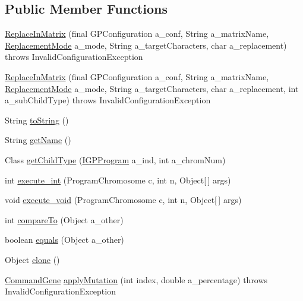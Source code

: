 \subsection*{Public Member Functions}
\begin{DoxyCompactItemize}
\item 
\hyperlink{classorg_1_1jgap_1_1gp_1_1function_1_1_replace_in_matrix_ae6f8fe40b80beb199a05b281ca554c11}{Replace\-In\-Matrix} (final G\-P\-Configuration a\-\_\-conf, String a\-\_\-matrix\-Name, \hyperlink{enumorg_1_1jgap_1_1gp_1_1function_1_1_replace_in_matrix_1_1_replacement_mode}{Replacement\-Mode} a\-\_\-mode, String a\-\_\-target\-Characters, char a\-\_\-replacement)  throws Invalid\-Configuration\-Exception 
\item 
\hyperlink{classorg_1_1jgap_1_1gp_1_1function_1_1_replace_in_matrix_a35cbed13007c21442ce503dc8bb9cfef}{Replace\-In\-Matrix} (final G\-P\-Configuration a\-\_\-conf, String a\-\_\-matrix\-Name, \hyperlink{enumorg_1_1jgap_1_1gp_1_1function_1_1_replace_in_matrix_1_1_replacement_mode}{Replacement\-Mode} a\-\_\-mode, String a\-\_\-target\-Characters, char a\-\_\-replacement, int a\-\_\-sub\-Child\-Type)  throws Invalid\-Configuration\-Exception 
\item 
String \hyperlink{classorg_1_1jgap_1_1gp_1_1function_1_1_replace_in_matrix_a9d9ac5ee1c8a6814f7cb063e15868216}{to\-String} ()
\item 
String \hyperlink{classorg_1_1jgap_1_1gp_1_1function_1_1_replace_in_matrix_a75502ffde9d73ed1eb1b5ac0bf783b69}{get\-Name} ()
\item 
Class \hyperlink{classorg_1_1jgap_1_1gp_1_1function_1_1_replace_in_matrix_aefd10165e5155d78a86a194c85322aef}{get\-Child\-Type} (\hyperlink{interfaceorg_1_1jgap_1_1gp_1_1_i_g_p_program}{I\-G\-P\-Program} a\-\_\-ind, int a\-\_\-chrom\-Num)
\item 
int \hyperlink{classorg_1_1jgap_1_1gp_1_1function_1_1_replace_in_matrix_a84dbd5daa8e2c738d837a943ee6ba38a}{execute\-\_\-int} (Program\-Chromosome c, int n, Object\mbox{[}$\,$\mbox{]} args)
\item 
void \hyperlink{classorg_1_1jgap_1_1gp_1_1function_1_1_replace_in_matrix_a099cd97deb3a46b5b69e17fb8ba48aef}{execute\-\_\-void} (Program\-Chromosome c, int n, Object\mbox{[}$\,$\mbox{]} args)
\item 
int \hyperlink{classorg_1_1jgap_1_1gp_1_1function_1_1_replace_in_matrix_a7deb312915219433abef58f3c38adea1}{compare\-To} (Object a\-\_\-other)
\item 
boolean \hyperlink{classorg_1_1jgap_1_1gp_1_1function_1_1_replace_in_matrix_a1323812a3f0abf036702c8884b59755a}{equals} (Object a\-\_\-other)
\item 
Object \hyperlink{classorg_1_1jgap_1_1gp_1_1function_1_1_replace_in_matrix_a4c7bdfab72376e5442019ac6714c8e79}{clone} ()
\item 
\hyperlink{classorg_1_1jgap_1_1gp_1_1_command_gene}{Command\-Gene} \hyperlink{classorg_1_1jgap_1_1gp_1_1function_1_1_replace_in_matrix_afd62d5f2b688e62992987d8ced904bc1}{apply\-Mutation} (int index, double a\-\_\-percentage)  throws Invalid\-Configuration\-Exception 
\end{DoxyCompactItemize}
